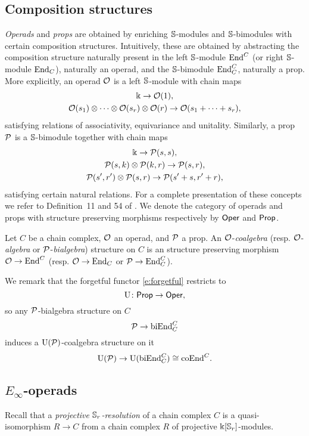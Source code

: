 \subsection{Composition structures}

\textit{Operads} and \textit{props} are obtained by enriching $\mathbb{S}$-modules and $\mathbb{S}$-bimodules with certain composition structures.
Intuitively, these are obtained by abstracting the composition structure naturally present in the left $\mathbb{S}$-module $\mathrm{End}^C$ (or right $\mathbb{S}$-module $\mathrm{End}_C$), naturally an operad, and the $\mathbb{S}$-bimodule $\mathrm{End}^C_C$, naturally a prop.
More explicitly, an operad $\mathcal{O}$ is a left $\mathbb{S}$-module with chain maps
\begin{gather*}
	\Bbbk \to \mathcal{O}(1), \\
	\mathcal{O}(s_1) \otimes \dotsb \otimes \mathcal{O}(s_r) \otimes \mathcal{O}(r) \to \mathcal{O}(s_1 + \dots + s_r),
\end{gather*}
satisfying relations of associativity, equivariance and unitality.
Similarly, a prop $\mathcal{P}$ is a $\mathbb{S}$-bimodule together with chain maps
\begin{gather*}
	\Bbbk \to \mathcal{P}(s,s), \\
	\mathcal{P}(s, k) \otimes \mathcal{P}(k, r) \to \mathcal{P}(s,r), \\
	\mathcal{P}(s^\prime, r^\prime) \otimes \mathcal{P}(s, r) \to \mathcal{P}(s^\prime+s, r^\prime+r),
\end{gather*}
satisfying certain natural relations.
For a complete presentation of these concepts we refer to Definition~11 and 54 of \cite{markl2008props}.
We denote the category of operads and props with structure preserving morphisms respectively by $\mathsf{Oper}$ and $\mathsf{Prop}$.


Let $C$ be a chain complex, $\mathcal{O}$ an operad, and $\mathcal{P}$ a prop.
An $\mathcal{O}$-\textit{coalgebra} (resp. $\mathcal{O}$-\textit{algebra} or $\mathcal{P}$-\textit{bialgebra}) structure on $C$ is an structure preserving morphism $\mathcal{O} \to \mathrm{End}^C$ (resp. $\mathcal{O} \to \mathrm{End}_C$ or $\mathcal{P} \to \mathrm{End}_C^C$).

We remark that the forgetful functor \eqref{e:forgetful} restricts to
\[
\operatorname{U} \colon \mathsf{Prop} \to \mathsf{Oper},
\]
so any $\mathcal{P}$-bialgebra structure on $C$
\[
\mathcal{P} \to \mathrm{biEnd}_C^C
\]
induces a $\operatorname{U}(\mathcal{P})$-coalgebra structure on it
\[
\operatorname{U}(\mathcal{P}) \to \operatorname{U}(\mathrm{biEnd}_C^C) \cong \mathrm{coEnd}^C.
\]

\subsection{\texorpdfstring{${E_\infty}$}{E-infty}-operads}

Recall that a \textit{projective $\mathbb{S}_r$-resolution} of a chain complex $C$ is a quasi-isomorphism $R \to C$ from a chain complex $R$ of projective $\Bbbk[\mathbb{S}_r]$-modules.

